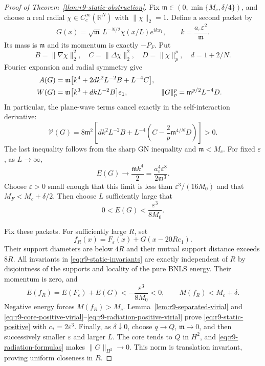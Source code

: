\begin{proof}[Proof of Theorem~\ref{thm:r9-static-obstruction}]
Fix $\mathfrak m\in(0,\min\{M_c,\delta/4\})$, and choose a real
radial $\chi\in C_c^\infty(\mathbb R^N)$ with $\|\chi\|_2=1$.
Define a second packet by
\begin{equation}\label{eq:r9-balancing-packet}
 G(x)=\sqrt{\mathfrak m}\,L^{-N/2}\chi(x/L)e^{ikx_1},
 \qquad k=\frac{a_\varepsilon\varepsilon^2}{\mathfrak m}.
\end{equation}
Its mass is $\mathfrak m$ and its momentum is exactly $-P_F$.
Put
\[
 B=\|\nabla\chi\|_2^2,\quad C=\|\Delta\chi\|_2^2,
 \quad D=\|\chi\|_p^p,\quad d=1+2/N.
\]
Fourier expansion and radial symmetry give
\begin{align}
 A(G)&=\mathfrak m\bigl[k^4+2d k^2L^{-2}B+L^{-4}C\bigr],
 \label{eq:r9-radiation-formulas}\\
 W(G)&=\mathfrak m\bigl[k^3+d kL^{-2}B\bigr]e_1,
 &\|G\|_p^p&=\mathfrak m^{p/2}L^{-4}D.\notag
\end{align}
In particular, the plane-wave terms cancel exactly in the
self-interaction derivative:
\begin{equation}\label{eq:r9-radiation-positive-virial}
 \mathcal V(G)=8\mathfrak m^2
 \left[d k^2L^{-2}B+
 L^{-4}\left(C-\frac2p\mathfrak m^{4/N}D\right)\right]>0.
\end{equation}
The last inequality follows from the sharp GN inequality and
$\mathfrak m<M_c$.
For fixed $\varepsilon$, as $L\to\infty$,
\[
 E(G)\longrightarrow\frac{\mathfrak m k^4}{2}
 =\frac{a_\varepsilon^4\varepsilon^8}{2\mathfrak m^3}.
\]
Choose $\varepsilon>0$ small enough that this limit is less than
$\varepsilon^3/(16M_0)$ and that $M_F<M_c+\delta/2$.
Then choose $L$ sufficiently large that
\begin{equation}\label{eq:r9-radiation-energy-budget}
 0<E(G)<\frac{\varepsilon^3}{8M_0}.
\end{equation}

Fix these packets. For sufficiently large $R$, set
\[
 f_R(x)=F_\varepsilon(x)+G(x-20Re_1).
\]
Their support diameters are below $4R$ and their mutual support
distance exceeds $8R$. All invariants in
\eqref{eq:r9-static-invariants} are exactly independent of $R$
by disjointness of the supports and locality of the pure BNLS
energy. Their momentum is zero, and
\[
 E(f_R)=E(F_\varepsilon)+E(G)<-\frac{\varepsilon^3}{8M_0}<0,
 \qquad M(f_R)<M_c+\delta.
\]
Negative energy forces $M(f_R)>M_c$. Lemma~\ref{lem:r9-separated-virial}
and \eqref{eq:r9-core-positive-virial}--\eqref{eq:r9-radiation-positive-virial}
prove \eqref{eq:r9-static-positive} with $c_*=2\varepsilon^3$.
Finally, as $\delta\downarrow0$, choose $q\to Q$,
$\mathfrak m\to0$, and then successively smaller $\varepsilon$
and larger $L$. The core tends to $Q$ in $H^2$, and
\eqref{eq:r9-radiation-formulas} makes $\|G\|_{H^2}\to0$.
This norm is translation invariant, proving uniform closeness
in $R$.
\end{proof}


